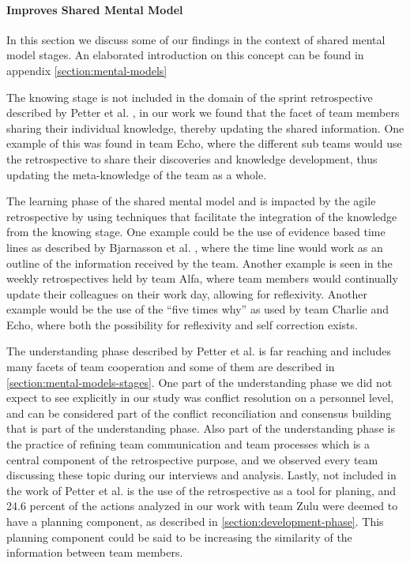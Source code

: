 \paragraph{Improves Shared Mental Model}
In this section we discuss some of our findings in the context of shared mental model stages. An elaborated introduction on this concept can be found in appendix \autoref{section:mental-models}

The knowing stage is not included in the domain of the sprint retrospective described by Petter et al. \cite{Petter2013}, in our work we found that the facet of team members sharing their individual knowledge, thereby updating the shared information. One example of this was found in team Echo, where the different sub teams would use the retrospective to share their discoveries and knowledge development, thus updating the meta-knowledge of the team as a whole. 

The learning phase of the shared mental model and is impacted by the agile retrospective by using techniques that facilitate the integration of the knowledge from the knowing stage. One example could be the use of evidence based time lines as described by Bjarnasson et al. \cite{Bjarnason2012}, where the time line would work as an outline of the information received by the team. Another example is seen in the weekly retrospectives held by team Alfa, where team members would continually update their colleagues on their work day, allowing for reflexivity. Another example would be the use of the ``five times why'' as used by team Charlie and Echo, where both the possibility for reflexivity and self correction exists.

The understanding phase described by Petter et al. \cite{Petter2013} is far reaching and includes many facets of team cooperation and some of them are described in \autoref{section:mental-models-stages}. One part of the understanding phase we did not expect to see explicitly in our study was conflict resolution on a personnel level, and can be considered part of the conflict reconciliation and consensus building that is part of the understanding phase. Also part of the understanding phase is the practice of refining team communication and team processes which is a central component of the retrospective purpose, and we observed every team discussing these topic during our interviews and analysis. Lastly, not included in the work of Petter et al. is the use of the retrospective as a tool for planing, and 24.6 percent of the actions analyzed in our work with team Zulu were deemed to have a planning component, as described in \autoref{section:development-phase}. This planning component could be said to be increasing the similarity of the information between team members.

